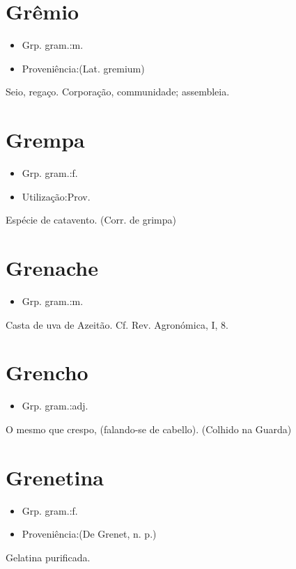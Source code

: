 \section{Grêmio}
\begin{itemize}
\item {Grp. gram.:m.}
\end{itemize}
\begin{itemize}
\item {Proveniência:(Lat. \textunderscore gremium\textunderscore )}
\end{itemize}
Seio, regaço.
Corporação, communidade; assembleia.
\section{Grempa}
\begin{itemize}
\item {Grp. gram.:f.}
\end{itemize}
\begin{itemize}
\item {Utilização:Prov.}
\end{itemize}
Espécie de catavento.
(Corr. de \textunderscore grimpa\textunderscore )
\section{Grenache}
\begin{itemize}
\item {Grp. gram.:m.}
\end{itemize}
Casta de uva de Azeitão. Cf. \textunderscore Rev. Agronómica\textunderscore , I, 8.
\section{Grencho}
\begin{itemize}
\item {Grp. gram.:adj.}
\end{itemize}
O mesmo que \textunderscore crespo\textunderscore , (falando-se de cabello). (Colhido na Guarda)
\section{Grenetina}
\begin{itemize}
\item {Grp. gram.:f.}
\end{itemize}
\begin{itemize}
\item {Proveniência:(De \textunderscore Grenet\textunderscore , n. p.)}
\end{itemize}
Gelatina purificada.
